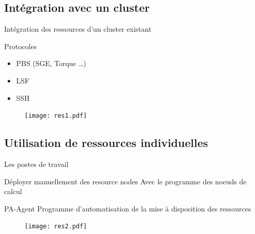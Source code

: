 \documentclass{beamer}
\begin{document}
\subsection{Intégration avec un cluster}
\begin{frame}{Intégration des ressources d'un cluster existant}
    \begin{block}{Protocoles}
    \begin{itemize}
        \item PBS (SGE, Torque \ldots)
        \item LSF
        \item SSH  
    \end{itemize}
        
    \end{block}
        \begin{figure}
            \centering
            \texttt{[image: res1.pdf]}
        \end{figure}
\end{frame}
\subsection{Utilisation de ressources individuelles}
\begin{frame}
	\tableofcontents[currentsubsection]
\end{frame}
\begin{frame}{Les postes de travail}
    \begin{block}{Déployer manuellement des resource nodes}
    Avec le programme des noeuds de calcul
        
    \end{block}
    \begin{block}{PA-Agent}
    Programme d'automatisation de la mise à disposition des ressources
        
    \end{block}
    \vspace{0.2cm}
        \begin{figure}
            \centering
            \texttt{[image: res2.pdf]}
        \end{figure}
\end{frame}
\end{document}
